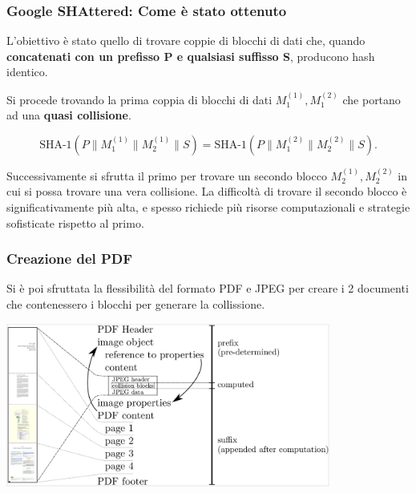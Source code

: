 \begin{frame}
\frametitle{Google SHAttered: Come è stato ottenuto}

L'obiettivo è stato quello di trovare coppie di blocchi di dati che, quando \textbf{concatenati con un prefisso P e qualsiasi suffisso S}, producono hash identico.

Si procede trovando la prima coppia di blocchi di dati \(M_{1}^{(1)}, M_{1}^{(2)}\) che portano ad una \textbf{quasi collisione}.

\[
\text{SHA-1} \left( P \parallel M_{1}^{(1)} \parallel M_{2}^{(1)} \parallel S \right) = \text{SHA-1} \left( P \parallel M_{1}^{(2)} \parallel M_{2}^{(2)} \parallel S \right).
\]


Successivamente si sfrutta il primo per trovare un secondo blocco \(M_{2}^{(1)}, M_{2}^{(2)}\) in cui si possa trovare una vera collisione.
La difficoltà di trovare il secondo blocco è significativamente più alta, e spesso richiede più risorse computazionali e strategie sofisticate rispetto al primo.

\end{frame}

\begin{frame}
\frametitle{Creazione del PDF}

Si è poi sfruttata la flessibilità del formato PDF e JPEG per creare i 2 documenti che contenessero i blocchi per generare la collissione.

\begin{center}
    \includegraphics[width=0.8\textwidth]{img/2-img/pdf_format.png}
\end{center}

\end{frame}
